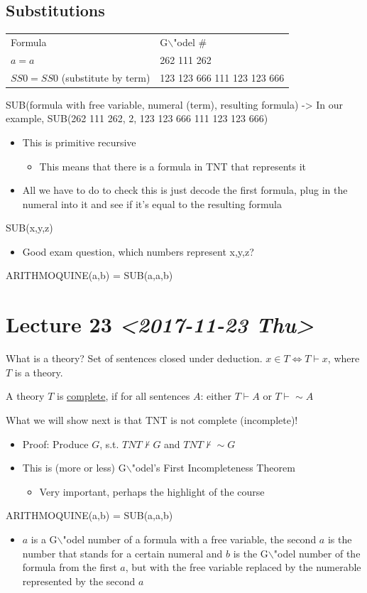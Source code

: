 \documentclass[11pt]{article}
\begin{document}
\subsection{Substitutions}
\label{sec:org2598219}
\begin{center}
\begin{tabular}{ll}
Formula & G$\backslash$"odel \#\\
\(a=a\) & 262 111 262\\
\(SS0=SS0\) (substitute by term) & 123 123 666 111 123 123 666\\
\end{tabular}
\end{center}
SUB(formula with free variable, numeral (term), resulting formula) -> In our example, SUB(262 111 262, 2, 123 123 666 111 123 123 666)   
\begin{itemize}
\item This is primitive recursive
\begin{itemize}
\item This means that there is a formula in TNT that represents it
\end{itemize}
\item All we have to do to check this is just decode the first formula, plug in the numeral into it and see if it's equal to the resulting formula
\end{itemize}

SUB(x,y,z)
\begin{itemize}
\item Good exam question, which numbers represent x,y,z?
\end{itemize}

ARITHMOQUINE(a,b) = SUB(a,a,b)
\section{Lecture 23 \textit{<2017-11-23 Thu>}}
\label{sec:orgd5e9284}
What is a theory? Set of sentences closed under deduction. \(x\in T \iff T \vdash x\), where \(T\) is a theory.

A theory \(T\) is \uline{complete}, if for all sentences \(A\): either \(T \vdash A\) or \(T \vdash \sim A\)

What we will show next is that TNT is not complete (incomplete)!
\begin{itemize}
\item Proof: Produce \(G\), s.t. \(TNT \nvdash G\) and \(TNT \nvdash \sim G\)
\item This is (more or less) G$\backslash$"odel's First Incompleteness Theorem
\begin{itemize}
\item Very important, perhaps the highlight of the course
\end{itemize}
\end{itemize}
ARITHMOQUINE(a,b) = SUB(a,a,b)
\begin{itemize}
\item \(a\) is a G$\backslash$"odel number of a formula with a free variable, the second \(a\) is the number that stands for a certain numeral and \(b\) is the G$\backslash$"odel number of the formula from the first \(a\), but with the free variable replaced by the numerable represented by the second \(a\)
\end{itemize}
\end{document}
